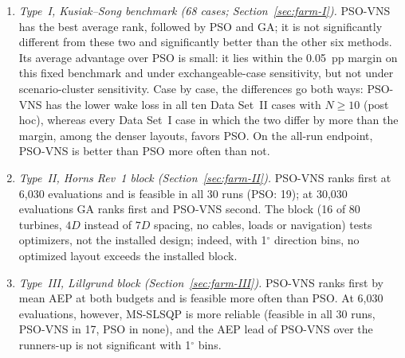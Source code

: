 \begin{enumerate}
\item \emph{Type~I, Kusiak--Song benchmark (68 cases; Section~\ref{sec:farm-I}).} PSO-VNS has the best average rank, followed by PSO and GA; it is not significantly different from these two and significantly better than the other six methods. Its average advantage over PSO is small: it lies within the 0.05~pp margin on this fixed benchmark and under exchangeable-case sensitivity, but not under scenario-cluster sensitivity. Case by case, the differences go both ways: PSO-VNS has the lower wake loss in all ten Data Set~II cases with $N\ge10$ (post hoc), whereas every Data Set~I case in which the two differ by more than the margin, among the denser layouts, favors PSO. On the all-run endpoint, PSO-VNS is better than PSO more often than not.
\item \emph{Type~II, Horns Rev~1 block (Section~\ref{sec:farm-II}).} PSO-VNS ranks first at 6,030 evaluations and is feasible in all 30 runs (PSO: 19); at 30,030 evaluations GA ranks first and PSO-VNS second. The block (16 of 80 turbines, $4D$ instead of $7D$ spacing, no cables, loads or navigation) tests optimizers, not the installed design; indeed, with 1$^\circ$ direction bins, no optimized layout exceeds the installed block.
\item \emph{Type~III, Lillgrund block (Section~\ref{sec:farm-III}).} PSO-VNS ranks first by mean AEP at both budgets and is feasible more often than PSO. At 6,030 evaluations, however, MS-SLSQP is more reliable (feasible in all 30 runs, PSO-VNS in 17, PSO in none), and the AEP lead of PSO-VNS over the runners-up is not significant with 1$^\circ$ bins.

\end{enumerate}
